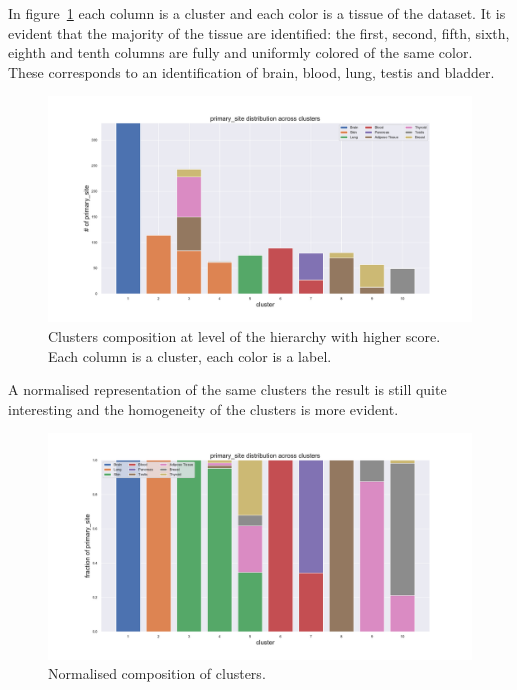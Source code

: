 In figure~\ref{fig:topic/gtex/oversigma_10tissue/clustercomposition_l3_primary_site} each column is a cluster and each color is a tissue of the dataset. It is evident that the majority of the tissue are identified: the first, second, fifth, sixth, eighth and tenth columns are fully and uniformly colored of the same color. These corresponds to an identification of brain, blood, lung, testis and bladder.
\begin{figure}[htb!]
    \centering
    \includegraphics[width=0.9\linewidth]{pictures/topic/gtex/oversigma_10tissue/clustercomposition_l3_primary_site.pdf}
    \caption{Clusters composition at level of the hierarchy with higher score. Each column is a cluster, each color is a label.}
    \label{fig:topic/gtex/oversigma_10tissue/clustercomposition_l3_primary_site}
\end{figure}
A normalised representation of the same clusters the result is still quite interesting and the homogeneity of the clusters is more evident.
\begin{figure}[htb!]
    \centering
    \includegraphics[width=0.9\linewidth]{pictures/topic/gtex/oversigma_10tissue/fraction_clustercomposition_l3_primary_site.pdf}
    \caption{Normalised composition of clusters.}
    \label{fig:topic/gtex/oversigma_10tissue/fraction_clustercomposition_l3_primary_site}
\end{figure}

